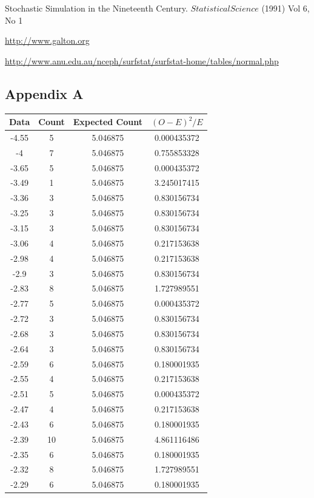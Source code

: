 \noindent
Stochastic Simulation in the Nineteenth Century. $Statistical Science$ (1991) Vol 6, No 1

\noindent
\url{http://www.galton.org}

\noindent
\url{http://www.anu.edu.au/nceph/surfstat/surfstat-home/tables/normal.php}

\subsection*{Appendix A}
\renewcommand{\baselinestretch}{1}
\begin{center}
{\scriptsize
\begin{tabular}{|c|c|c|c|}\hline
Data	& Count&	Expected Count&	$(O-E)^2/E$\\ \hline
-4.55	&	5	&	5.046875	&	0.000435372	\\
-4	&	7	&	5.046875	&	0.755853328	\\
-3.65	&	5	&	5.046875	&	0.000435372	\\
-3.49	&	1	&	5.046875	&	3.245017415	\\
-3.36	&	3	&	5.046875	&	0.830156734	\\
-3.25	&	3	&	5.046875	&	0.830156734	\\
-3.15	&	3	&	5.046875	&	0.830156734	\\
-3.06	&	4	&	5.046875	&	0.217153638	\\
-2.98	&	4	&	5.046875	&	0.217153638	\\
-2.9	&	3	&	5.046875	&	0.830156734	\\
-2.83	&	8	&	5.046875	&	1.727989551	\\
-2.77	&	5	&	5.046875	&	0.000435372	\\
-2.72	&	3	&	5.046875	&	0.830156734	\\
-2.68	&	3	&	5.046875	&	0.830156734	\\
-2.64	&	3	&	5.046875	&	0.830156734	\\
-2.59	&	6	&	5.046875	&	0.180001935	\\
-2.55	&	4	&	5.046875	&	0.217153638	\\
-2.51	&	5	&	5.046875	&	0.000435372	\\
-2.47	&	4	&	5.046875	&	0.217153638	\\
-2.43	&	6	&	5.046875	&	0.180001935	\\
-2.39	&	10	&	5.046875	&	4.861116486	\\
-2.35	&	6	&	5.046875	&	0.180001935	\\
-2.32	&	8	&	5.046875	&	1.727989551	\\
-2.29	&	6	&	5.046875	&	0.180001935	\\

\end{tabular}}
\end{center}
